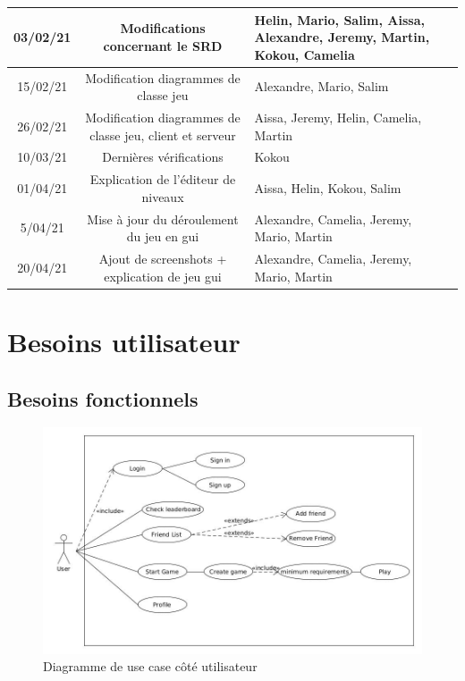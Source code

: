 \documentclass[a4paper,12pt]{article}
\begin{document}
\begin{tabularx}{16cm}{|c|c|X|}
	\hline
	    03/02/21 & Modifications concernant le SRD & Helin, Mario, Salim, Aissa,
		Alexandre, Jeremy, Martin, Kokou, Camelia\\
	\hline
	    15/02/21 & Modification diagrammes de classe jeu & Alexandre, Mario, Salim\\
	\hline
    	26/02/21 & Modification diagrammes de classe
	    jeu, client et serveur & Aissa, Jeremy, Helin, Camelia, Martin\\
	\hline
	    10/03/21 & Dernières vérifications & Kokou\\
	\hline
	    01/04/21 & Explication de l'éditeur de niveaux & Aissa, Helin, Kokou, Salim\\
	\hline
	    5/04/21 & Mise à jour du déroulement du jeu en gui & Alexandre, Camelia, Jeremy, Mario, Martin\\
	\hline
	    20/04/21 & Ajout de screenshots + explication de jeu gui & Alexandre, Camelia, Jeremy, Mario, Martin\\
	\hline

\end{tabularx}

\newpage

\section{Besoins utilisateur}

\subsection{Besoins fonctionnels}


\begin{figure}[h!]
\centering
\includegraphics[width=15cm]{images/UserUseCase.jpg}
\caption{Diagramme de use case côté utilisateur}
\label{fig:UserUseCase}
\end{figure}
\end{document}
